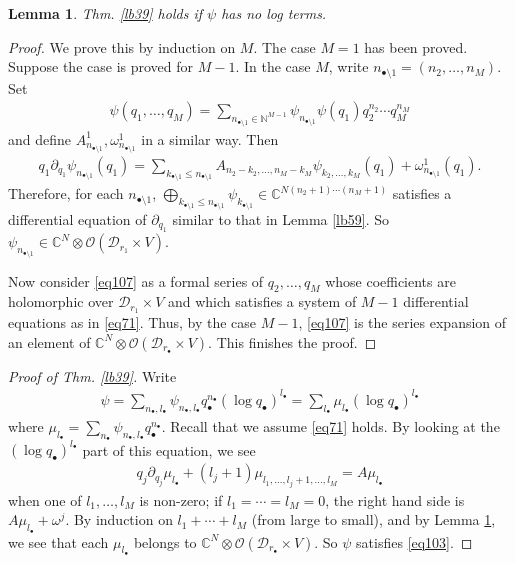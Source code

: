 \documentclass[11pt,b5paper,notitlepage]{article}
\theoremstyle{definition}
\theoremstyle{plain}
\newtheorem{lm}[df]{Lemma}
\newcommand{\mc}{\mathcal}
\newcommand{\scr}{\mathscr}
\newcommand{\blt}{\bullet}
\newcommand{\Cbb}{\mathbb C}
\newcommand{\Nbb}{\mathbb N}
\numberwithin{equation}{section}
\begin{document}
\begin{lm}\label{lb60}
Thm. \ref{lb39} holds if $\psi$ has no log terms. 
\end{lm}
\begin{proof}
We prove this by induction on $M$. The case $M=1$ has been proved. Suppose the case is proved for $M-1$. In the case $M$, write $n_{\blt\setminus 1}=(n_2,\dots,n_M)$. Set
\begin{gather}
\psi(q_1,\dots,q_M)=\sum_{n_{\blt\setminus 1}\in\Nbb^{M-1}}\psi_{n_{\blt\setminus 1}}\psi(q_1)q_2^{n_2}\cdots q_M^{n_M}\label{eq107}
\end{gather}	
and define $A^1_{n_{\blt\setminus 1}},\omega^1_{n_{\blt\setminus 1}}$ in a similar way. Then
\begin{align*}
q_1\partial_{q_1}\psi_{n_{\blt\setminus 1}}(q_1)=\sum_{k_{\blt\setminus 1}\leq n_{\blt\setminus 1}}A_{n_2-k_2,\dots,n_M-k_M}\psi_{k_2,\dots,k_M}(q_1)+\omega^1_{n_{\blt\setminus 1}}(q_1).	
\end{align*}
Therefore, for each $n_{\blt\setminus 1}$, $\bigoplus_{k_{\blt\setminus 1}\leq n_{\blt\setminus 1}}\psi_{k_{\blt\setminus 1}}\in\Cbb^{N(n_2+1)\cdots (n_M+1)}$ satisfies a differential equation of $\partial_{q_1}$ similar to that in Lemma \ref{lb59}. So $\psi_{n_{\blt\setminus 1}}\in\Cbb^N\otimes\scr O(\mc D_{r_1}\times V)$.

Now consider \eqref{eq107} as a formal series of $q_2,\dots,q_M$ whose coefficients are holomorphic over $\mc D_{r_1}\times V$ and which satisfies a system of $M-1$ differential equations as in \eqref{eq71}. Thus, by the case $M-1$, \eqref{eq107} is the series expansion of an element of $\Cbb^N\otimes\scr O(\mc D_{r_\blt}\times V)$. This finishes the proof.
\end{proof}




\begin{proof}[Proof of Thm. \ref{lb39}]
Write
\begin{align*}
\psi=\sum_{n_\blt,l_\blt}\psi_{n_\blt,l_\blt}q_\blt^{n_\blt}(\log q_\blt)^{l_\blt}=\sum_{l_\blt}\mu_{l_\blt}(\log q_\blt)^{l_\blt}	
\end{align*}
where $\mu_{l_\blt}=\sum_{n_\blt}\psi_{n_\blt,l_\blt}q_\blt^{n_\blt}$. Recall that we assume \eqref{eq71} holds. By looking at the  $(\log q_\blt)^{l_\blt}$ part of this equation, we see
\begin{align*}
	q_j\partial_{q_j}\mu_{l_\blt}+(l_j+1)\mu_{l_1,\dots,l_j+1,\dots,l_M}=A\mu_{l_\blt}	
\end{align*}
when one of $l_1,\dots,l_M$ is non-zero; if $l_1=\cdots=l_M=0$, the right hand side is $A\mu_{l_\blt}+\omega^j$. By induction on $l_1+\cdots+l_M$ (from large to small), and by Lemma \ref{lb60}, we see that each $\mu_{l_\blt}$ belongs to  $\Cbb^N\otimes\scr O(\mc D_{r_\blt}\times V)$. So $\psi$ satisfies \eqref{eq103}.
\end{proof}
\end{document}
